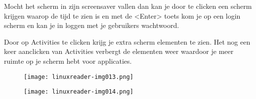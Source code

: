 {
\foreignlanguage{dutch}{Mocht het scherm in zijn screensaver vallen dan kan je door te clicken een scherm krijgen waarop
de tijd te zien is en met de {\textless}Enter{\textgreater} toets kom je op een login scherm en kan je in loggen met je
gebruikers wachtwoord.}}

{
\foreignlanguage{dutch}{Door op Activities te clicken krijg je extra scherm elementen te zien. Het nog een keer
aanclicken van Activities verbergt de elementen weer waardoor je meer ruimte op je scherm hebt voor applicaties.}}



\begin{figure}[H]
\texttt{[image: linuxreader-img013.png]}
\end{figure}
\begin{figure}[H]
\texttt{[image: linuxreader-img014.png]}
\end{figure}
